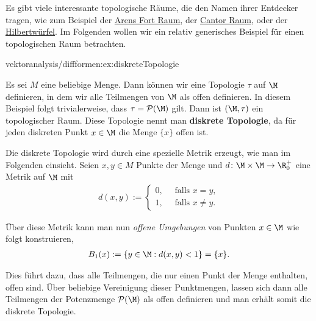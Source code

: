 \documentclass[letterpaper,10pt,english]{jupyterBook}
\begin{document}
\par
Es gibt viele interessante topologische Räume, die den Namen ihrer Entdecker tragen, wie zum Beispiel der \href{https://de.wikipedia.org/wiki/Arens-Fort-Raum}{Arens Fort Raum}, der \href{https://de.wikipedia.org/wiki/Cantor-Raum}{Cantor Raum}, oder der \href{https://de.wikipedia.org/wiki/Hilbertw\%C3\%BCrfel}{Hilbertwürfel}.
Im Folgenden wollen wir ein relativ generisches Beispiel für einen topologischen Raum betrachten.
\begin{example}{}{vektoranalysis/diffformen:ex:diskreteTopologie}



\par
Es sei \(M\) eine beliebige Menge.
Dann können wir eine Topologie \(\tau\) auf \(\M\) definieren, in dem wir alle Teilmengen von \(\M\) als offen definieren.
In diesem Beispiel folgt trivialerweise, dass \(\tau = \mathcal{P}(\M)\) gilt.
Dann ist \((\M, \tau)\) ein topologischer Raum.
Diese Topologie nennt man \textbf{diskrete Topologie}, da für jeden diskreten Punkt \(x \in \M\) die Menge \(\lbrace x \rbrace\) offen ist.

\par
Die diskrete Topologie wird durch eine spezielle Metrik erzeugt, wie man im Folgenden einsieht.
Seien \(x,y \in M\) Punkte der Menge und \(d \colon \M \times \M \rightarrow \R^+_0\) eine Metrik auf \(\M\) mit
\begin{align*}
d(x,y) := \begin{cases} 0, \quad \text{ falls } x=y,\\ 1, \quad \text{ falls } x\neq y. \end{cases}
\end{align*}
\par
Über diese Metrik kann man nun \emph{offene Umgebungen} von Punkten \(x \in \M\) wie folgt konstruieren,
\begin{align*}
B_1(x) := \lbrace y \in \M : d(x,y) < 1 \rbrace = \lbrace x \rbrace.
\end{align*}
\par
Dies führt dazu, dass alle Teilmengen, die nur einen Punkt der Menge enthalten, offen sind.
Über beliebige Vereinigung dieser Punktmengen, lassen sich dann alle Teilmengen der Potenzmenge \(\mathcal{P}(\M)\) als offen definieren und man erhält somit die diskrete Topologie.
\end{example}
\end{document}

